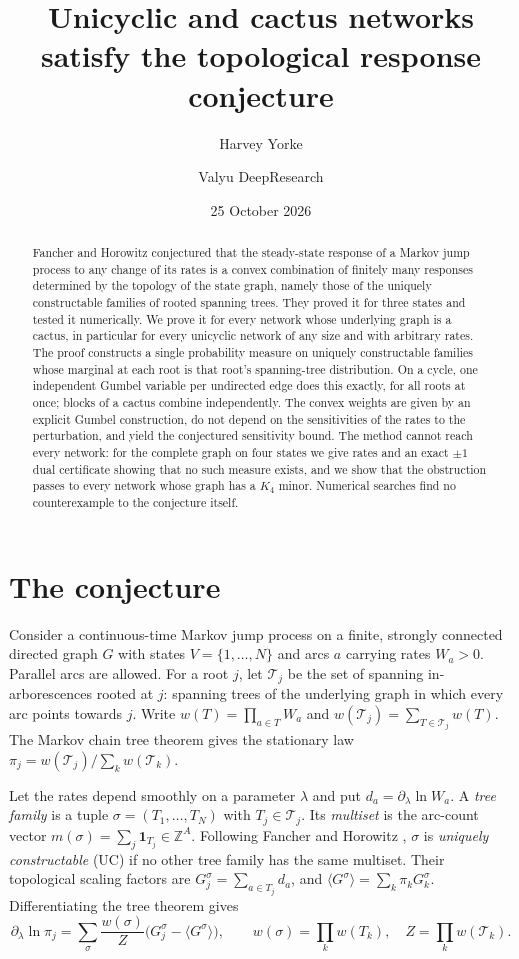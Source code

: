 \documentclass[11pt]{amsart}
\title{Unicyclic and cactus networks satisfy the topological response conjecture}
\author{Harvey Yorke}
\author{Valyu DeepResearch}
\date{25 October 2026}
\theoremstyle{definition}
\theoremstyle{remark}
\newcommand{\T}{\mathcal T}
\newcommand{\Z}{\mathbb Z}
\begin{document}
\raggedbottom
\begin{abstract}
Fancher and Horowitz conjectured that the steady-state response of a Markov jump process to any change of its rates is a convex combination of finitely many responses determined by the topology of the state graph, namely those of the uniquely constructable families of rooted spanning trees. They proved it for three states and tested it numerically. We prove it for every network whose underlying graph is a cactus, in particular for every unicyclic network of any size and with arbitrary rates. The proof constructs a single probability measure on uniquely constructable families whose marginal at each root is that root's spanning-tree distribution. On a cycle, one independent Gumbel variable per undirected edge does this exactly, for all roots at once; blocks of a cactus combine independently. The convex weights are given by an explicit Gumbel construction, do not depend on the sensitivities of the rates to the perturbation, and yield the conjectured sensitivity bound. The method cannot reach every network: for the complete graph on four states we give rates and an exact $\pm1$ dual certificate showing that no such measure exists, and we show that the obstruction passes to every network whose graph has a $K_4$ minor. Numerical searches find no counterexample to the conjecture itself.
\end{abstract}
\maketitle

\section{The conjecture}

Consider a continuous-time Markov jump process on a finite, strongly connected directed graph $G$ with states $V=\{1,\dots,N\}$ and arcs $a$ carrying rates $W_a>0$. Parallel arcs are allowed. For a root $j$, let $\T_j$ be the set of spanning in-arborescences rooted at $j$: spanning trees of the underlying graph in which every arc points towards $j$. Write $w(T)=\prod_{a\in T}W_a$ and $w(\T_j)=\sum_{T\in\T_j}w(T)$. The Markov chain tree theorem \cite{Hill1966,Schnakenberg1976} gives the stationary law $\pi_j=w(\T_j)/\sum_k w(\T_k)$.

Let the rates depend smoothly on a parameter $\lambda$ and put $d_a=\partial_\lambda\ln W_a$. A \emph{tree family} is a tuple $\sigma=(T_1,\dots,T_N)$ with $T_j\in\T_j$. Its \emph{multiset} is the arc-count vector $m(\sigma)=\sum_j \mathbf 1_{T_j}\in\Z^{A}$. Following Fancher and Horowitz \cite{FH2026}, $\sigma$ is \emph{uniquely constructable} (UC) if no other tree family has the same multiset. Their topological scaling factors are $G^\sigma_j=\sum_{a\in T_j}d_a$, and $\langle G^\sigma\rangle=\sum_k\pi_kG^\sigma_k$. Differentiating the tree theorem gives \cite[Eq.~(5)]{FH2026}
\begin{equation}\label{eq:five}
 \partial_\lambda\ln\pi_j=\sum_\sigma \frac{w(\sigma)}{Z}\bigl(G^\sigma_j-\langle G^\sigma\rangle\bigr),\qquad w(\sigma)=\prod_k w(T_k),\quad Z=\prod_k w(\T_k).
\end{equation}
\end{document}
